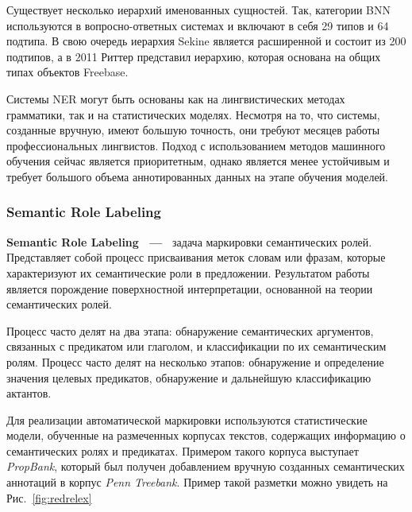 Существует несколько иерархий именованных сущностей. Так, категории BNN используются в вопросно-ответных системах и включают в себя 29 типов и 64 подтипа. В свою очередь иерархия Sekine является расширенной и состоит из 200 подтипов, а в 2011 Риттер представил иерархию, которая основана на общих типах объектов Freebase. 

Системы NER могут быть основаны как на лингвистических методах грамматики, так и на статистических моделях. Несмотря на то, что системы, созданные вручную, имеют большую точность, они требуют месяцев работы профессиональных лингвистов. Подход с использованием методов машинного обучения сейчас является приоритетным, однако является менее устойчивым и требует большого объема аннотированных данных на этапе обучения моделей. 

\subsubsection{Semantic Role Labeling}
\textbf{Semantic Role Labeling  ~---~} задача маркировки семантических ролей. Представляет собой процесс присваивания меток словам или фразам, которые характеризуют их семантические роли в предложении. Результатом работы является порождение поверхностной интерпретации, основанной на теории семантических ролей.

Процесс часто делят на два этапа: обнаружение семантических аргументов, связанных с предикатом или глаголом, и классификации по их семантическим ролям. 
Процесс часто делят на несколько этапов:  обнаружение и определение значения целевых предикатов, обнаружение и дальнейшую классификацию актантов. 

Для реализации автоматической маркировки используются статистические модели, обученные на размеченных корпусах текстов, содержащих информацию о семантических ролях и предикатах. Примером такого корпуса выступает \emph{PropBank}, который был получен добавлением вручную созданных семантических аннотаций в корпус \emph{Penn Treebank}. Пример такой разметки можно увидеть на Рис.~\ref{fig:redrelex}

